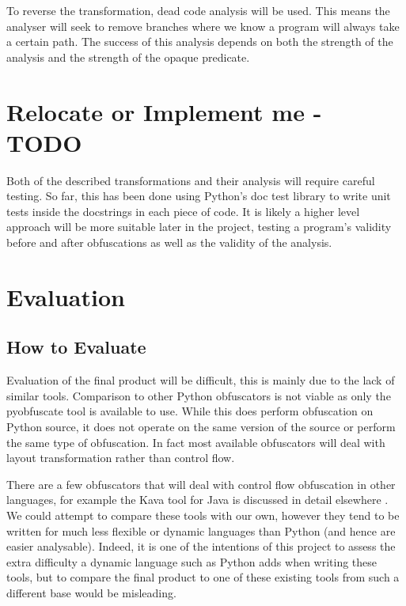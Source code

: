 \documentclass{report}
\begin{document}
To reverse the transformation, dead code analysis will be used. This means the analyser will seek to remove
branches where we know a program will always take a certain path. The success of this analysis
depends on both the strength of the analysis and the strength of the opaque predicate.

\section{Relocate or Implement me - TODO}

Both of the described transformations and their analysis will require careful testing. So far,
this has been done using Python's doc test library to write unit tests inside the docstrings
in each piece of code. It is likely a higher level approach will be more suitable later in
the project, testing a program's validity before and after obfuscations as well as the validity
of the analysis.

\section{Evaluation}

\subsection{How to Evaluate}

Evaluation of the final product will be difficult, this is mainly due to the lack of similar tools.
Comparison to other Python obfuscators is not viable as only the pyobfuscate tool is available to
use. While this does perform obfuscation on Python source, it does not operate on the same version of
the source or perform the same type of obfuscation. In fact most available obfuscators will deal with
layout transformation rather than control flow.

There are a few obfuscators that will deal with control flow obfuscation in other languages, for example
the Kava tool for Java is discussed in detail elsewhere \cite{taxobftrans}. We could attempt to compare these
tools with our own, however they tend to be written for much less flexible or dynamic languages than
Python (and hence are easier analysable). Indeed, it is one of the intentions of this project to assess the
extra difficulty a dynamic language such as Python adds when writing these tools, but to compare the final
product to one of these existing tools from such a different base would be misleading.
\end{document}
